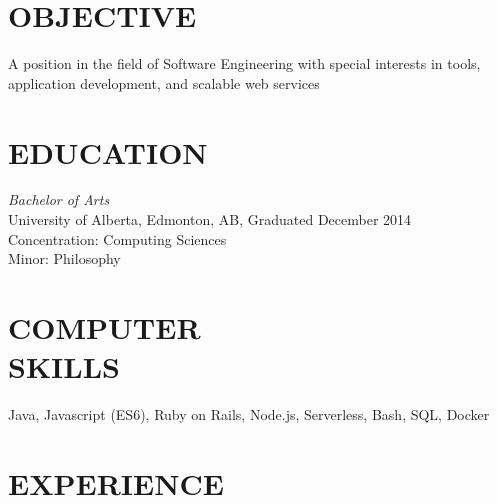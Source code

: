 \documentclass[margin, 10pt]{res} %
\begin{document}
\begin{resume}

 
\section{OBJECTIVE}  

A position in the field of Software Engineering with special interests in tools, application development, and scalable web services 


\section{EDUCATION}

{\sl Bachelor of Arts}\\
University of Alberta, Edmonton, AB, Graduated December 2014 \\
Concentration: Computing Sciences \\
Minor: Philosophy
 

\section{COMPUTER \\ SKILLS} 

Java, Javascript (ES6), Ruby on Rails, Node.js, Serverless, Bash, SQL, Docker\\
 
 
\section{EXPERIENCE}


\end{resume}
\end{document}
